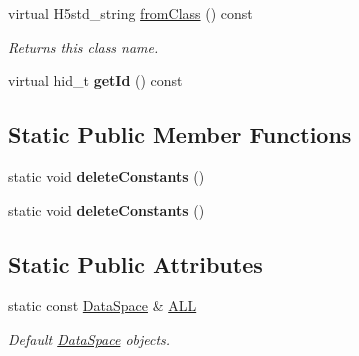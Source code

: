 \begin{DoxyCompactItemize}
\item 
\mbox{\label{class_h5_1_1_data_space_a127e32a992f905e055ba1576d18c7d1f}} 
virtual H5std\+\_\+string \hyperlink{class_h5_1_1_data_space_a127e32a992f905e055ba1576d18c7d1f}{from\+Class} () const
\begin{DoxyCompactList}\small\item\em Returns this class name. \end{DoxyCompactList}\item 
\mbox{\label{class_h5_1_1_data_space_a119f84e49f0e8fb45dda38fc63395724}} 
virtual hid\+\_\+t {\bfseries get\+Id} () const
\end{DoxyCompactItemize}
\subsection*{Static Public Member Functions}
\begin{DoxyCompactItemize}
\item 
\mbox{\label{class_h5_1_1_data_space_a848d649c260251e93111a5cabf8a0c33}} 
static void {\bfseries delete\+Constants} ()
\item 
\mbox{\label{class_h5_1_1_data_space_a848d649c260251e93111a5cabf8a0c33}} 
static void {\bfseries delete\+Constants} ()
\end{DoxyCompactItemize}
\subsection*{Static Public Attributes}
\begin{DoxyCompactItemize}
\item 
\mbox{\label{class_h5_1_1_data_space_ae8a22405edd631eb923a327d39462ff2}} 
static const \hyperlink{class_h5_1_1_data_space}{Data\+Space} \& \hyperlink{class_h5_1_1_data_space_ae8a22405edd631eb923a327d39462ff2}{A\+LL}
\begin{DoxyCompactList}\small\item\em Default \hyperlink{class_h5_1_1_data_space}{Data\+Space} objects. \end{DoxyCompactList}\end{DoxyCompactItemize}
